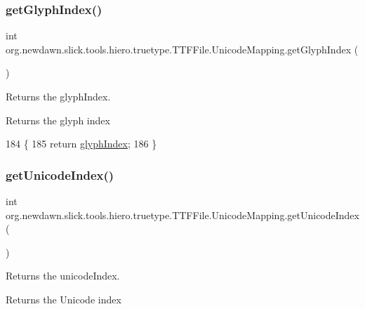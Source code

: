 \subsubsection{\texorpdfstring{get\+Glyph\+Index()}{getGlyphIndex()}}
{\footnotesize\ttfamily int org.\+newdawn.\+slick.\+tools.\+hiero.\+truetype.\+T\+T\+F\+File.\+Unicode\+Mapping.\+get\+Glyph\+Index (\begin{DoxyParamCaption}{ }\end{DoxyParamCaption})\hspace{0.3cm}{\ttfamily [inline]}}

Returns the glyph\+Index. \begin{DoxyReturn}{Returns}
the glyph index 
\end{DoxyReturn}

\begin{DoxyCode}
184                                    \{
185             \textcolor{keywordflow}{return} \mbox{\hyperlink{classorg_1_1newdawn_1_1slick_1_1tools_1_1hiero_1_1truetype_1_1_t_t_f_file_1_1_unicode_mapping_a55775fd2735847638605b42c45e58eed}{glyphIndex}};
186         \}
\end{DoxyCode}
\mbox{\label{classorg_1_1newdawn_1_1slick_1_1tools_1_1hiero_1_1truetype_1_1_t_t_f_file_1_1_unicode_mapping_a8aa4cc05ddc34ac0b6bd20c833f89f7c}} 
\subsubsection{\texorpdfstring{get\+Unicode\+Index()}{getUnicodeIndex()}}
{\footnotesize\ttfamily int org.\+newdawn.\+slick.\+tools.\+hiero.\+truetype.\+T\+T\+F\+File.\+Unicode\+Mapping.\+get\+Unicode\+Index (\begin{DoxyParamCaption}{ }\end{DoxyParamCaption})\hspace{0.3cm}{\ttfamily [inline]}}

Returns the unicode\+Index. \begin{DoxyReturn}{Returns}
the Unicode index 
\end{DoxyReturn}

